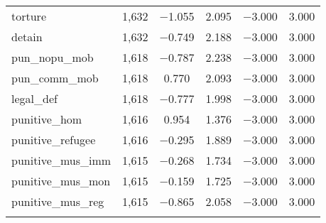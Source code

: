 \begin{table}[H]
\begin{tabular}{@{\extracolsep{5pt}}lccccc}
torture & 1,632 & $-$1.055 & 2.095 & $-$3.000 & 3.000 \\ 
detain & 1,632 & $-$0.749 & 2.188 & $-$3.000 & 3.000 \\ 
pun\_nopu\_mob & 1,618 & $-$0.787 & 2.238 & $-$3.000 & 3.000 \\ 
pun\_comm\_mob & 1,618 & 0.770 & 2.093 & $-$3.000 & 3.000 \\ 
legal\_def & 1,618 & $-$0.777 & 1.998 & $-$3.000 & 3.000 \\ 
punitive\_hom & 1,616 & 0.954 & 1.376 & $-$3.000 & 3.000 \\ 
punitive\_refugee & 1,616 & $-$0.295 & 1.889 & $-$3.000 & 3.000 \\ 
punitive\_mus\_imm & 1,615 & $-$0.268 & 1.734 & $-$3.000 & 3.000 \\ 
punitive\_mus\_mon & 1,615 & $-$0.159 & 1.725 & $-$3.000 & 3.000 \\ 
punitive\_mus\_reg & 1,615 & $-$0.865 & 2.058 & $-$3.000 & 3.000 \\ 
\hline \\[-1.8ex] 
\end{tabular} 
\end{table} 

